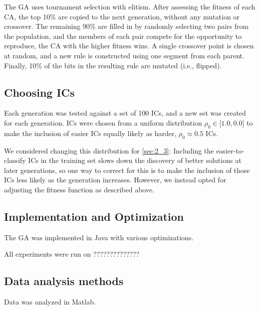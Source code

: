 The GA uses tournament selection with elitism. After assessing the fitness of each CA, the top 10\% are copied to the next generation, 
without any mutation or crossover. The remaining 90\% are filled in by randomly selecting two pairs from the population, and the members of 
each pair compete for the opportunity to reproduce, the CA with the higher fitness wins. A single crossover point is chosen at random, 
and a new rule is constructed using one segment from each parent. Finally, 10\% of the bits in the resulting rule are mutated (i.e., flipped).

\subsection{Choosing ICs}

Each generation was tested against a set of 100 ICs, and a new set was created for each generation. ICs were chosen 
from a uniform distribution $\rho_0 \in \lbrack1.0, 0.0\rbrack$ to make the inclusion of easier ICs equally likely as 
harder, $\rho_0 \approx 0.5$ ICs.

We considered changing this distribution for \ref{sec:2_3}: Including the easier-to-classify ICs in the training set 
slows down the discovery of better solutions at later generations, so one way to correct for this is to make the inclusion of 
those ICs less likely as the generation increases. However, we instead opted for adjusting the fitness function as described 
above.

\subsection{Implementation and Optimization}

The GA was implemented in Java with various optimizations. 

All experiments were run on ??????????????

\subsection{Data analysis methods}

Data was analyzed in Matlab.


